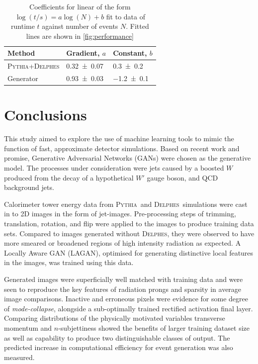 \documentclass[twocolumn]{article}
\newcommand{\pkg}[1]{\textsc{#1}}
\newcommand{\pythia}{\pkg{Pythia}}
\newcommand{\delphes}{\pkg{Delphes}}
\begin{document}
\begin{table}[!htbp]
	\centering
	\begin{tabular}{@{}lll@{}}
		\toprule Method  & Gradient, $a$ & Constant, $b$\\
		\midrule \pythia+\delphes  & \num{0.32+-0.07} & \num{0.3+-0.2}\\
				 Generator  & \num{0.93+-0.03} & \num{-1.2+-0.1}\\
		
		\bottomrule
	\end{tabular}
	\caption{Coefficients for linear of the form  $\log(t/s) = a\log(N) + b$ fit to data of runtime $t$ against number of events $N$. Fitted lines are shown in \cref{fig:performance}}
	\label{tab:speed}
\end{table}

\section{Conclusions}
\label{sec:conclusions}
This study aimed to explore the use of machine learning tools to mimic the function of fast, approximate detector simulations. Based on recent work and promise, Generative Adversarial Networks (GANs) were chosen as the generative model. The processes under consideration were jets caused by a boosted $W$ produced from the decay of a hypothetical $W'$ gauge boson, and QCD background jets. 

Calorimeter tower energy data from \pythia~and \delphes~simulations were cast in to 2D images in the form of jet-images. Pre-processing steps of trimming, translation, rotation, and flip were applied to the images to produce training data sets. Compared to images generated without \delphes, they were observed to have more smeared or broadened regions of high intensity radiation as expected. A Locally Aware GAN (LAGAN), optimised for generating distinctive local features in the images, was trained using this data. 

Generated images were superficially well matched with training data and were seen to reproduce the key features of radiation prongs and sparsity in average image comparisons. Inactive and erroneous pixels were evidence for some degree of \textit{mode-collapse}, alongside a sub-optimally trained rectified activation final layer. Comparing distributions of the physically motivated variables transverse momentum and $n$-subjettiness showed the benefits of larger training dataset size as well as capability to produce two distinguishable classes of output. The predicted increase in computational efficiency for event generation was also measured. 
\end{document}
